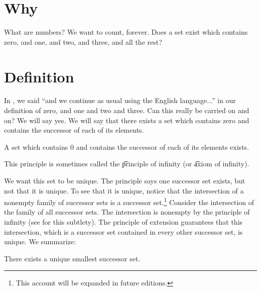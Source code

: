 

\section*{Why}

What are numbers?
We want to count, forever.
Does a set exist which contains zero, and one, and two, and three, and all the rest?

\section*{Definition}

In , we said ``and we continue as usual using the English language...'' in our definition of zero, and one and two and three.
Can this really be carried on and on?
We will say yes.
We will say that there exists a set which contains zero and contains the successor of each of its elements.

\begin{principle}
A set which contains 0 and contains the successor of each of its elements exists.
\end{principle}

This principle is sometimes called the \t{principle of infinity} (or \t{axiom of infinity}).

We want this set to be unique.
The principle says one successor set exists, but not that it is unique.
To see that it is unique, notice that the intersection of a nonempty family of successor sets is a successor set.\footnote{This account will be expanded in future editions.}
Consider the intersection of the family of all successor sets.
The intersection is nonempty by the principle of infinity (see for this subtlety).
The principle of extension guarantees that this intersection, which is a successor set contained in every other successor set, is unique.
We summarize:

\begin{proposition}

\label{natural_numbers:proposition:omega}There exists a unique smallest successor set.
\end{proposition}

